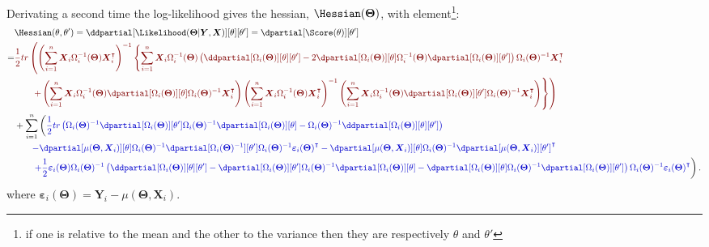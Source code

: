 \documentclass[12pt]{article}
\newcommand{\darkblue}{blue!80!black}
\newcommand{\darkred}{red!50!black}
\newcommand\trans[1]{{#1}^\intercal}%
\newcommand{\param}{\Theta}
\newcommand{\Vparam}{\boldsymbol{\param}}
\newcommand{\VX}{\boldsymbol{X}}
\newcommand{\VY}{\boldsymbol{Y}}
\newcommand{\Vvarepsilon}{\boldsymbol{\varepsilon}}
\begin{document}
Derivating a second time the log-likelihood gives the hessian, \(\Hessian(\Vparam)\), with element\footnote{if one is relative to the mean and the other to the variance then they are respectively \(\theta\) and \(\theta'\)}:
\begin{align*}
& \Hessian(\theta,\theta^{\prime}) = \ddpartial[\Likelihood(\Vparam|\VY,\VX)][\theta][\theta^{\prime}] = \dpartial[\Score(\theta)][\theta^{\prime}] \\
=& \textcolor{\darkred}{\frac{1}{2} tr \left( \left(\sum_{i=1}^n \VX_i \Omega_i^{-1}(\Vparam) \trans{\VX}_i\right)^{-1} \left\{ \sum_{i=1}^n \VX_i \Omega_i^{-1}(\Vparam) \left(\ddpartial[\Omega_i(\Vparam)][\theta][\theta^{\prime}] - 2 \dpartial[\Omega_i(\Vparam)][\theta] \Omega_i^{-1}(\Vparam) \dpartial[\Omega_i(\Vparam)][\theta^{\prime}]\right)\Omega_i(\Vparam)^{-1} \trans{\VX}_i \right.  \right.}  \\
& \textcolor{\darkred}{ \left. \left. \qquad + \left(\sum_{i=1}^n \VX_i \Omega_i^{-1}(\Vparam) \dpartial[\Omega_i(\Vparam)][\theta] \Omega_i(\Vparam)^{-1} \trans{\VX}_i\right) \left(\sum_{i=1}^n \VX_i\Omega_i^{-1}(\Vparam) \trans{\VX}_i \right)^{-1} \left(\sum_{i=1}^n \VX_i \Omega_i^{-1}(\Vparam) \dpartial[\Omega_i(\Vparam)][\theta^{\prime}] \Omega_i(\Vparam)^{-1} \trans{\VX}_i\right) \right\} \right) } \\
& +\sum_{i=1}^n \left( \textcolor{\darkblue}{ \frac{1}{2} tr\left(\Omega_i(\Vparam)^{-1} \dpartial[\Omega_i(\Vparam)][\theta^{\prime}] \Omega_i(\Vparam)^{-1} \dpartial[\Omega_i(\Vparam)][\theta] - \Omega_i(\Vparam)^{-1} \ddpartial[\Omega_i(\Vparam)][\theta][\theta^{\prime}] \right) } \right.\\
& \qquad \textcolor{\darkblue}{ -  \dpartial[\mu(\Vparam,\VX_i)][\theta] \Omega_i(\Vparam)^{-1} \dpartial[\Omega_i(\Vparam)^{-1}][\theta^{\prime}] \Omega_i(\Vparam)^{-1} \trans{\Vvarepsilon_i(\Vparam)} - \dpartial[\mu(\Vparam,\VX_i)][\theta] \Omega_i(\Vparam)^{-1} \trans{\dpartial[\mu(\Vparam,\VX_i)][\theta^{\prime}]} } \\
& \qquad \left. \textcolor{\darkblue}{ + \frac{1}{2} \Vvarepsilon_i(\Vparam) \Omega_i(\Vparam)^{-1} \left(\ddpartial[\Omega_i(\Vparam)][\theta][\theta^{\prime}] - \dpartial[\Omega_i(\Vparam)][\theta^{\prime}] \Omega_i(\Vparam)^{-1} \dpartial[\Omega_i(\Vparam)][\theta] - \dpartial[\Omega_i(\Vparam)][\theta] \Omega_i(\Vparam)^{-1} \dpartial[\Omega_i(\Vparam)][\theta^{\prime}] \right) \Omega_i(\Vparam)^{-1} \trans{\Vvarepsilon_i(\Vparam)} } \right).
\end{align*}
where \(\Vvarepsilon_i(\Vparam) = \VY_i-\mu(\Vparam,\VX_i)\).
\end{document}
